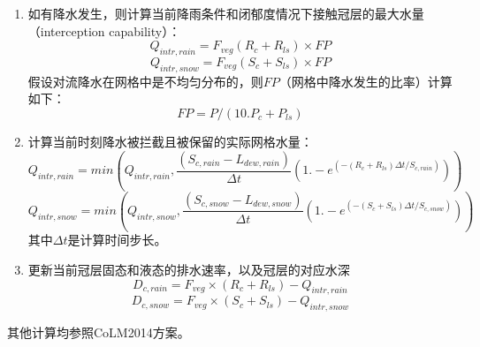\begin{enumerate}
\item 如有降水发生，则计算当前降雨条件和闭郁度情况下接触冠层的最大水量（interception capability）：
\begin{equation}
Q_{intr,rain} =F_{veg}\left(R_{c}+R_{ls}\right)\times FP
\end{equation}
\begin{equation}
Q_{intr,snow} =F_{veg}\left(S_{c}+S_{ls}\right)\times FP
\end{equation}
假设对流降水在网格中是不均匀分布的，则$FP$（网格中降水发生的比率）计算如下：
\begin{equation}
FP = P/ (10.P_{c} + P_{ls})
\end{equation}
\item 计算当前时刻降水被拦截且被保留的实际网格水量：
\begin{equation}
Q_{intr,rain} = min(Q_{intr,rain},  \frac{(S_{c,rain} - L_{dew,rain})}{\Delta{t}}  (1.-e^{(-\left(R_{c}+R_{ls}\right)\Delta{t}/S_{c,rain})}) )
\end{equation}
\begin{equation}
Q_{intr,snow} = min(Q_{intr,snow}, \frac{(S_{c,snow} - L_{dew,snow})}{\Delta{t}} (1.-e^{(-\left(S_{c}+S_{ls}\right)\Delta{t}/S_{c,snow})}) )
\end{equation}
其中${\Delta{t}}$是计算时间步长。
\item 更新当前冠层固态和液态的排水速率，以及冠层的对应水深
\begin{equation}
D_{c,rain}=F_{veg} \times (R_{c}+R_{ls})-Q_{intr,rain}
\end{equation}
\begin{equation}
D_{c,snow}=F_{veg} \times (S_{c}+S_{ls})-Q_{intr,snow}
\end{equation}
\end{enumerate}
其他计算均参照CoLM2014方案。
